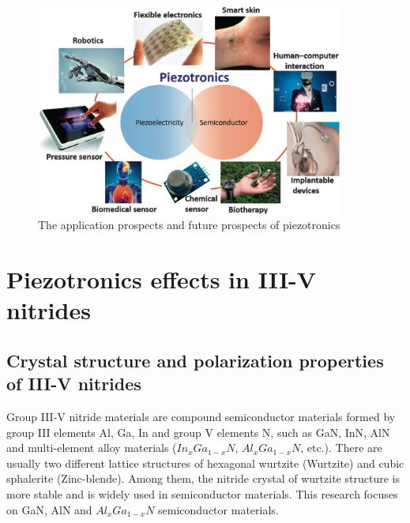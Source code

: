 \begin{figure}[H] 
\centering    
\includegraphics[width=0.9\textwidth]{ch1_6}
\caption[The application prospects and future prospects of piezotronics]{The application prospects and future prospects of piezotronics \protect\cite{hu2018piezotronic}}
\label{fig:1.6}
\end{figure}

\section{Piezotronics effects in III-V nitrides} 
\subsection{Crystal structure and polarization properties of III-V nitrides}

Group III-V nitride  materials are compound semiconductor materials formed by group III elements Al, Ga, In and group V elements N, such as GaN, InN, AlN and multi-element alloy materials ($In_{x}Ga_{1-x}N$, $Al_{x}Ga_{1-x}N$, etc.). There are usually two different lattice structures of hexagonal  wurtzite (Wurtzite) and cubic sphalerite (Zinc-blende). Among them, the nitride crystal  of wurtzite structure is more stable and is widely used in semiconductor materials. This research focuses on GaN, AlN and $Al_{x}Ga_{1-x}N$  semiconductor materials. 

